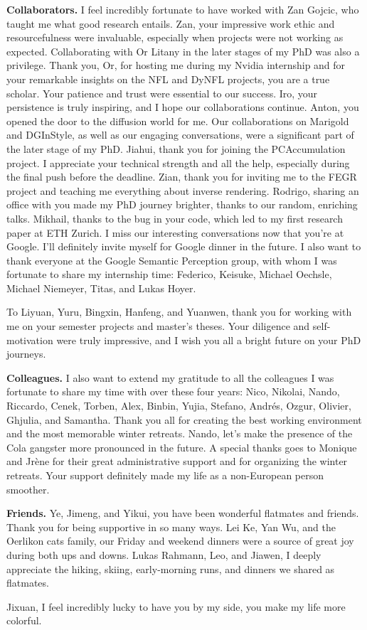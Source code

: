 \noindent
\textbf{Collaborators.}
I feel incredibly fortunate to have worked with Zan Gojcic, who taught me what good research entails. Zan, your impressive work ethic and resourcefulness were invaluable, especially when projects were not working as expected. Collaborating with Or Litany in the later stages of my PhD was also a privilege. Thank you, Or, for hosting me during my Nvidia internship and for your remarkable insights on the NFL and DyNFL projects, you are a true scholar. Your patience and trust were essential to our success. Iro, your persistence is truly inspiring, and I hope our collaborations continue. Anton, you opened the door to the diffusion world for me. Our collaborations on Marigold and DGInStyle, as well as our engaging conversations, were a significant part of the later stage of my PhD. Jiahui, thank you for joining the PCAccumulation project. I appreciate your technical strength and all the help, especially during the final push before the deadline. Zian, thank you for inviting me to the FEGR project and teaching me everything about inverse rendering.  Rodrigo, sharing an office with you made my PhD journey brighter, thanks to our random, enriching talks. Mikhail, thanks to the bug in your code, which led to my first research paper at ETH Zurich. I miss our interesting conversations now that you're at Google. I'll definitely invite myself for Google dinner in the future. I also want to thank everyone at the Google Semantic Perception group, with whom I was fortunate to share my internship time: Federico, Keisuke, Michael Oechsle, Michael Niemeyer, Titas, and Lukas Hoyer.

To Liyuan, Yuru, Bingxin, Hanfeng, and Yuanwen, thank you for working with me on your semester projects and master's theses. Your diligence and self-motivation were truly impressive, and I wish you all a bright future on your PhD journeys.

\noindent
\textbf{Colleagues.}
I also want to extend my gratitude to all the colleagues I was fortunate to share my time with over these four years: Nico, Nikolai, Nando, Riccardo, Cenek, Torben, Alex, Binbin, Yujia, Stefano, Andrés, Ozgur, Olivier, Ghjulia, and Samantha. Thank you all for creating the best working environment and the most memorable winter retreats. Nando, let's make the presence of the Cola gangster more pronounced in the future. A special thanks goes to Monique and Jrène for their great administrative support and for organizing the winter retreats. Your support definitely made my life as a non-European person smoother. 

\noindent
\textbf{Friends.}
Ye, Jimeng, and Yikui, you have been wonderful flatmates and friends. Thank you for being supportive in so many ways. Lei Ke, Yan Wu, and the Oerlikon cats family, our Friday and weekend dinners were a source of great joy during both ups and downs. Lukas Rahmann, Leo, and Jiawen, I deeply appreciate the hiking, skiing, early-morning runs, and dinners we shared as flatmates.

Jixuan, I feel incredibly lucky to have you by my side, you make my life more colorful.